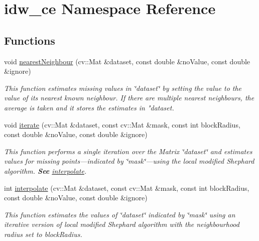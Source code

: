 \hypertarget{namespaceidw__ce}{}\section{idw\+\_\+ce Namespace Reference}
\label{namespaceidw__ce}
\subsection*{Functions}
\begin{DoxyCompactItemize}
\item 
void \hyperlink{namespaceidw__ce_ae1c5ab8c0578cf0103125e97fe9b69e9}{nearest\+Neighbour} (cv\+::\+Mat \&dataset, const double \&no\+Value, const double \&ignore)
\begin{DoxyCompactList}\small\item\em This function estimates missing values in \char`\"{}dataset\char`\"{} by setting the value to the value of its nearest known neighbour. If there are multiple nearest neighbours, the average is taken and it stores the estimates in "dataset. \end{DoxyCompactList}\item 
void \hyperlink{namespaceidw__ce_a0353314a195777f8ab2baa3d1aa61dcb}{iterate} (cv\+::\+Mat \&dataset, const cv\+::\+Mat \&mask, const int block\+Radius, const double \&no\+Value, const double \&ignore)
\begin{DoxyCompactList}\small\item\em This function performs a single iteration over the Matrix \char`\"{}dataset\char`\"{} and estimates values for missing points---indicated by \char`\"{}mask\char`\"{}---using the local modified Shephard algorithm. {\bfseries See} \hyperlink{namespaceidw__ce_af1a4c1755f98b117f835169d021e5086}{interpolate}. \end{DoxyCompactList}\item 
int \hyperlink{namespaceidw__ce_af1a4c1755f98b117f835169d021e5086}{interpolate} (cv\+::\+Mat \&dataset, const cv\+::\+Mat \&mask, const int block\+Radius, const double \&no\+Value, const double \&ignore)
\begin{DoxyCompactList}\small\item\em This function estimates the values of \char`\"{}dataset\char`\"{} indicated by \char`\"{}mask\char`\"{} using an iterative version of local modified Shephard algorithm with the neighbourhood radius set to block\+Radius. \end{DoxyCompactList}\end{DoxyCompactItemize}


